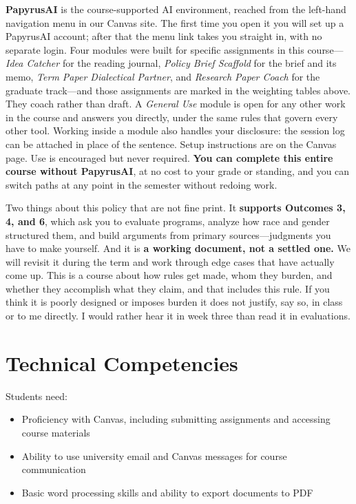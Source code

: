 \documentclass[12pt]{article}
\begin{document}
\vspace{0.5em}
\noindent \textbf{PapyrusAI} is the course-supported AI environment, reached from the left-hand navigation menu in our Canvas site. The first time you open it you will set up a PapyrusAI account; after that the menu link takes you straight in, with no separate login. Four modules were built for specific assignments in this course---\emph{Idea Catcher} for the reading journal, \emph{Policy Brief Scaffold} for the brief and its memo, \emph{Term Paper Dialectical Partner}, and \emph{Research Paper Coach} for the graduate track---and those assignments are marked in the weighting tables above. They coach rather than draft. A \emph{General Use} module is open for any other work in the course and answers you directly, under the same rules that govern every other tool. Working inside a module also handles your disclosure: the session log can be attached in place of the sentence. Setup instructions are on the Canvas page. Use is encouraged but never required. \textbf{You can complete this entire course without PapyrusAI}, at no cost to your grade or standing, and you can switch paths at any point in the semester without redoing work.

\vspace{0.5em}
\noindent Two things about this policy that are not fine print. It \textbf{supports Outcomes 3, 4, and 6}, which ask you to evaluate programs, analyze how race and gender structured them, and build arguments from primary sources---judgments you have to make yourself. And it is \textbf{a working document, not a settled one.} We will revisit it during the term and work through edge cases that have actually come up. This is a course about how rules get made, whom they burden, and whether they accomplish what they claim, and that includes this rule. If you think it is poorly designed or imposes burden it does not justify, say so, in class or to me directly. I would rather hear it in week three than read it in evaluations.

\section*{Technical Competencies}
Students need:
\begin{itemize}
\item Proficiency with Canvas, including submitting assignments and accessing course materials
\item Ability to use university email and Canvas messages for course communication
\item Basic word processing skills and ability to export documents to PDF
\end{itemize}
\end{document}

